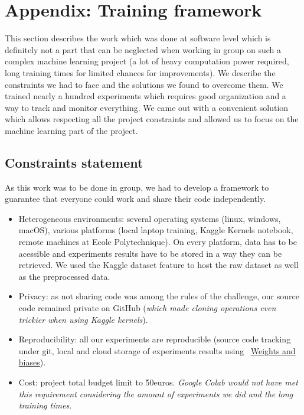 


\clearpage
\section{Appendix: Training framework}
\label{sec:training_fwk}
This section describes the work which was done at software level which is definitely not a part that can be neglected when working in group on such a complex machine learning project (a lot of heavy computation power required, long training times for limited chances for improvements).  We describe the constraints we had to face and the solutions we found to overcome them. We trained nearly a hundred experiments which requires good organization and a way to track and monitor everything.
We came out with a convenient solution which allows respecting all the project constraints and allowed us to focus on the machine learning part of the project.

\subsection*{Constraints statement}
\label{sec:Constraints}
As this work was to be done in group, we had to develop a framework to guarantee that everyone could work and share their code independently.
\begin{itemize}
    \item Heterogeneous environments: several operating systems (linux, windows, macOS), various platforms (local laptop training, Kaggle Kernels notebook, remote machines at Ecole Polytechnique). On every platform, data has to be acessible and experiments results have to be stored in a way they can be retrieved. We used the Kaggle dataset feature to  host the raw dataset as well as the preprocessed data.
    \item Privacy: as not sharing code was among the rules of the challenge, our source code remained private on GitHub (\textit{which made cloning operations even trickier when using Kaggle kernels}).
    \item Reproducibility: all our experiments are reproducible (source code tracking under git, local and cloud storage of experiments results using ~\href{https://wandb.ai/molecule-nlp-altegrad-23/molecule-nlp}{Weights and biases}).
    \item Cost: project total budget limit to 50euros. \textit{Google Colab would not have met this requirement considering the amount of experiments we did and the long training times}.
\end{itemize}



